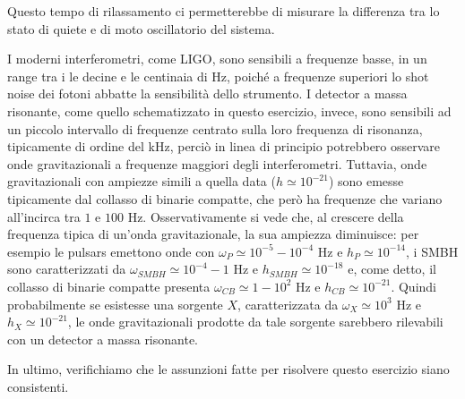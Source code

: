 \documentclass[a4paper,10pt]{article}
\begin{document}
Questo tempo di rilassamento ci permetterebbe di misurare la differenza tra lo stato di quiete e di moto oscillatorio del sistema.

I moderni interferometri, come LIGO, sono sensibili a frequenze basse, in un range tra i le decine e le centinaia di Hz, poiché a frequenze superiori lo shot noise dei fotoni abbatte la sensibilità dello strumento.
I detector a massa risonante, come quello schematizzato in questo esercizio, invece, sono sensibili ad un piccolo intervallo di frequenze centrato sulla loro frequenza di risonanza, tipicamente di ordine del kHz, perciò in linea di principio potrebbero osservare onde gravitazionali a frequenze maggiori degli interferometri. 
Tuttavia, onde gravitazionali con ampiezze simili a quella data ($h\simeq 10^{-21}$) sono emesse tipicamente dal collasso di binarie compatte, che però ha frequenze che variano all'incirca tra $1$ e $100$ Hz.
Osservativamente si vede che, al crescere della frequenza tipica di un'onda gravitazionale, la sua ampiezza diminuisce: per esempio le pulsars emettono onde con $\omega_P \simeq 10^{-5} - 10^{-4}$ Hz e $h_P \simeq 10^{-14}$, i SMBH sono caratterizzati da $\omega_{SMBH} \simeq 10^{-4} - 1$ Hz e $h_{SMBH} \simeq 10^{-18}$ e, come detto, il collasso di binarie compatte presenta $\omega_{CB} \simeq 1 - 10^{2}$ Hz e $h_{CB} \simeq 10^{-21}$.
Quindi probabilmente se esistesse una sorgente $X$, caratterizzata da $\omega_X \simeq 10^{3}$ Hz e $h_X \simeq 10^{-21}$, le onde gravitazionali prodotte da tale sorgente sarebbero rilevabili con un detector a massa risonante.

In ultimo, verifichiamo che le assunzioni fatte per risolvere questo esercizio siano consistenti.
\end{document}
